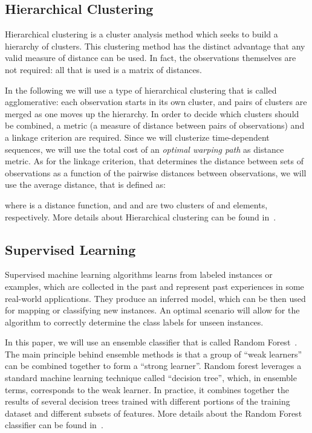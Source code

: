 \documentclass{acm_proc_article-sp}
\begin{document}
\subsection{Hierarchical Clustering}
\label{Hierarchical clustering}  

Hierarchical clustering is a cluster analysis method which 
seeks to build a hierarchy of clusters. This clustering method has the distinct 
advantage that any valid measure of distance can be used. In fact, 
the observations themselves are not required: all that is used is a matrix of 
distances.

In the following we will use a type of hierarchical clustering that is called 
agglomerative: each observation starts in its own cluster, and pairs 
of clusters are merged as one moves up the hierarchy. In order to decide which 
clusters should be combined, a metric (a measure of distance between 
pairs of observations) and a linkage criterion are required. Since we will 
clusterize time-dependent sequences, we will use the total cost of an 
\emph{optimal warping path} as distance metric. As for the linkage 
criterion, that determines the distance between sets of observations as a 
function of the pairwise distances between observations, we will use the 
average 
distance, that is defined as:
 
where  is a distance function, and  and  are two clusters of  and  elements, respectively.
More details about Hierarchical clustering can be found in~\cite{hastie09statisticallearning}.


\subsection{Supervised Learning}
 \label{Classification}
Supervised machine learning algorithms learns from labeled instances or 
examples, which are collected in the past and represent past experiences in 
some real-world applications. They produce an inferred model, which can be then 
used for mapping or classifying new instances. An optimal scenario will allow 
for the algorithm to correctly determine the class labels for unseen instances.

In this paper, we will use an ensemble classifier that is called Random 
Forest~\cite{Breiman:2001:RF:570181.570182}.
The main principle behind ensemble methods is that a group of ``weak learners'' 
can be combined together to form a ``strong learner''. 
Random forest leverages a standard machine learning technique called 
 ``decision tree'', which, in ensemble terms, corresponds to the weak learner. 
In practice, it combines together the results of several decision trees trained 
with different portions of the training dataset and different subsets of 
features. More details about the Random Forest classifier can be 
found in~\cite{Breiman:2001:RF:570181.570182}.
\end{document}
